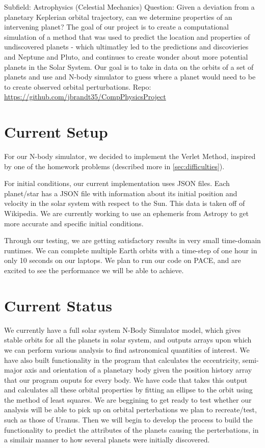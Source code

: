 \documentclass[a4paper,12pt]{article} %
\numberwithin{equation}{section} %
\numberwithin{figure}{section} %
\begin{document}
Subfield: Astrophysics (Celestial Mechanics) \newline
Question: Given a deviation from a planetary Keplerian orbital trajectory, can we determine properties of an intervening planet? \newline
The goal of our project is to create a computational simulation of a method that was used to predict the location and properties of undiscovered planets - which ultimatley led to the predictions and discovieries and Neptune and Pluto, and continues to create wonder about more potential planets in the Solar System. Our goal is to take in data on the orbits of a set of planets and use and N-body simulator to guess where a planet would need to be to create observed orbital perturbations. \newline
Repo: \url{https://github.com/jbrandt35/CompPhysicsProject}

\section{Current Setup}

For our N-body simulator, we decided to implement the Verlet Method, inspired by one of the homework problems (described more in \ref{sec:difficulties}). \par
For initial conditions, our current implementation uses JSON files. Each planet/star has a JSON file with information about its initial position and velocity in the solar system with respect to the Sun. This data is taken off of Wikipedia. We are currently working to use an ephemeris from Astropy to get more accurate and specific initial conditions. \par
Through our testing, we are getting satisfactory results in very small time-domain runtimes. We can complete multiple Earth orbits with a time-step of one hour in only 10 seconds on our laptops. We plan to run our code on PACE, and are excited to see the performance we will be able to achieve.



\section{Current Status}
We currently have a full solar system N-Body Simulator model, which gives stable orbits for all the planets in solar system, and outputs arrays upon which we can perform various analysis to find astronomical quantities of interest. We have also built functionality in the program that calculates the eccentricity, semi-major axis and orientation of a planetary body given the position history array that our program ouputs for every body. We have code that takes this output and calculates all these orbital properties by fitting an ellipse to the orbit using the method of least squares. We are beggining to get ready to test whether our analysis will be able to pick up on orbital perterbations we plan to recreate/test, such as those of Uranus. Then we will begin to develop the process to build the functionality to predict the attributes of the planets causing the perterbations, in a similair manner to how several planets were initially discovered.
\end{document}
